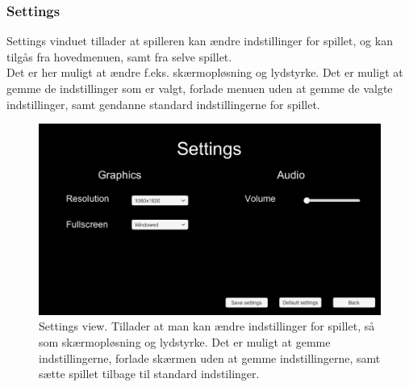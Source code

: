 \subsubsection{Settings}
Settings vinduet tillader at spilleren kan ændre indstillinger for spillet, og kan tilgås fra hovedmenuen, samt fra selve spillet.\\
Det er her muligt at ændre f.eks. skærmopløsning og lydstyrke. Det er muligt at gemme de indstillinger som er valgt, forlade menuen uden at gemme de valgte indstillinger, samt gendanne standard indstillingerne for spillet. 

\begin{figure}[H]
\centering
\includegraphics[width = \textwidth]{02-Body/Images/settingsMockup.PNG}
\caption{Settings view. Tillader at man kan ændre indstillinger for spillet, så som skærmopløsning og lydstyrke. Det er muligt at gemme indstillingerne, forlade skærmen uden at gemme indstillingerne, samt sætte spillet tilbage til standard indstilinger.}
\label{fig:Design-FE-mockup-settings}
\end{figure}

\newpage
